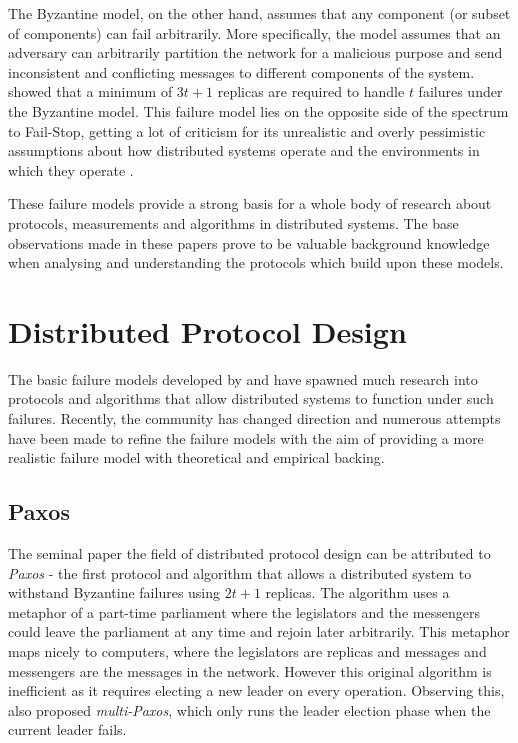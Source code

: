 The Byzantine model, on the other hand, assumes that any component (or subset of components) can fail arbitrarily. More specifically, the model assumes that an adversary can arbitrarily partition the network for a malicious purpose and send inconsistent and conflicting messages to different components of the system. \citet{byzantine} showed that a minimum of $3t + 1$ replicas are required to handle $t$ failures under the Byzantine model. This failure model lies on the opposite side of the spectrum to Fail-Stop, getting a lot of criticism for its unrealistic and overly pessimistic assumptions about how distributed systems operate and the environments in which they operate \citep{xft, visigoth}.

These failure models provide a strong basis for a whole body of research about protocols, measurements and algorithms in distributed systems. The base observations made in these papers prove to be valuable background knowledge when analysing and understanding the protocols which build upon these models. 

\section{Distributed Protocol Design}
The basic failure models developed by \citet{fail-stop} and \citet{byzantine} have spawned much research into protocols and algorithms that allow distributed systems to function under such failures. Recently, the community has changed direction and numerous attempts have been made to refine the failure models with the aim of providing a more realistic failure model with theoretical and empirical backing.

\subsection{Paxos}

The seminal paper the field of distributed protocol design can be attributed to \textit{Paxos} \citep{paxos} - the first protocol and algorithm that allows a distributed system to withstand Byzantine failures using $2t+1$ replicas. The algorithm uses a metaphor of a part-time parliament where the legislators and the messengers could leave the parliament at any time and rejoin later arbitrarily. This metaphor maps nicely to computers, where the legislators are replicas and messages and messengers are the messages in the network. However this original algorithm is inefficient as it requires electing a new leader on every operation. Observing this, \citeauthor{paxos} also proposed \textit{multi-Paxos}, which only runs the leader election phase when the current leader fails.

